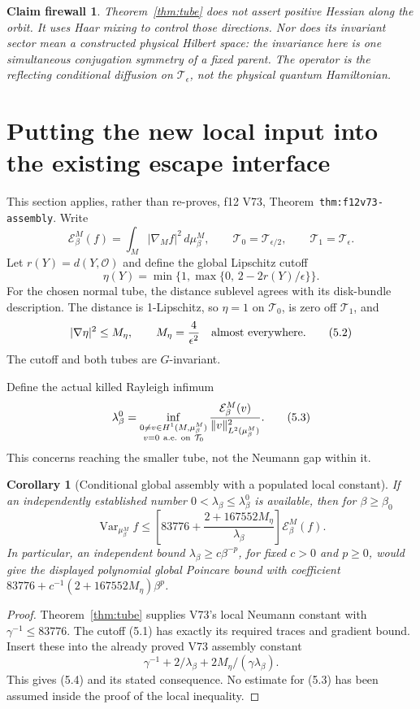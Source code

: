 \documentclass[11pt,oneside]{article}
\newtheorem{corollary}[theorem]{Corollary}
\newtheorem{firewall}[theorem]{Claim firewall}
\DeclareMathOperator{\Var}{Var}
\newcommand{\E}{\mathcal E}
\newcommand{\cO}{\mathcal O}
\newcommand{\cT}{\mathcal T}
\begin{document}
\begin{firewall}
Theorem~\ref{thm:tube} does not assert
positive Hessian along the orbit. It uses
Haar mixing to control those directions.
Nor does its invariant sector mean a
constructed physical Hilbert space: the
invariance here is one simultaneous
conjugation symmetry of a fixed parent.
The operator is the reflecting conditional
diffusion on \(\cT_\epsilon\), not the
physical quantum Hamiltonian.
\end{firewall}

\section{Putting the new local input into the existing escape interface}

This section applies, rather than re-proves,
f12 V73, Theorem~\texttt{thm:f12v73-assembly}.
Write
\[
 \E_\beta^M(f)=\int_M|\nabla_M f|^2\,d\mu_\beta^M,\qquad
 \cT_0=\cT_{\epsilon/2},\qquad
 \cT_1=\cT_\epsilon.
\]
Let \(r(Y)=d(Y,\cO)\) and define the
global Lipschitz cutoff
\[
 \eta(Y)=\min\{1,\max\{0,\,2-2r(Y)/\epsilon\}\}.
 \tag{5.1}
\]
For the chosen normal tube, the distance
sublevel agrees with its disk-bundle
description. The distance is 1-Lipschitz,
so \(\eta=1\) on \(\cT_0\), is zero
off \(\cT_1\), and
\[
                       |\nabla\eta|^2\le M_\eta,
                 \qquad M_\eta=\frac4{\epsilon^2}
                 \quad\hbox{almost everywhere}.
 \tag{5.2}
\]
The cutoff and both tubes are \(G\)-invariant.

Define the actual killed Rayleigh infimum
\[
 \lambda_\beta^0=
 \inf_{\substack{0\ne v\in H^1(M,\mu_\beta^M)\\
                           v=0\ {\rm a.e.\ on}\ \cT_0}}
             \frac{\E_\beta^M(v)}
                  {\|v\|_{L^2(\mu_\beta^M)}^2}.
 \tag{5.3}
\]
This concerns reaching the smaller tube,
not the Neumann gap within it.

\begin{corollary}[Conditional global assembly with a populated local constant]
\label{cor:assembly}
If an independently established number
\(0<\lambda_\beta\le\lambda_\beta^0\)
is available, then for \(\beta\ge\beta_0\)
\[
 \Var_{\mu_\beta^M} f
 \le
 \left[
   83776+
    \frac{2+167552M_\eta}{\lambda_\beta}
 \right]\E_\beta^M(f).
 \tag{5.4}
\]
In particular, an independent bound
\(\lambda_\beta\ge c\beta^{-p}\), for
fixed \(c>0\) and \(p\ge0\), would give
the displayed polynomial global
Poincare bound with coefficient
\(83776+c^{-1}(2+167552M_\eta)\beta^p\).
\end{corollary}
\begin{proof}
Theorem~\ref{thm:tube} supplies V73's
local Neumann constant with
\(\gamma^{-1}\le83776\).
The cutoff (5.1) has exactly its
required traces and gradient bound.
Insert these into the already proved
V73 assembly constant
\[
             \gamma^{-1}+2/\lambda_\beta
                          +2M_\eta/(\gamma\lambda_\beta).
\]
This gives (5.4) and its stated consequence.
No estimate for (5.3) has been assumed
inside the proof of the local inequality.
\end{proof}
\end{document}
